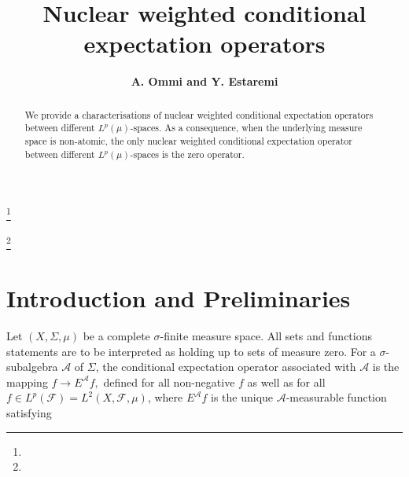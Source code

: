 \documentclass{amsart}
\theoremstyle{definition}\newtheorem{defn}[thm]{Definition}
\theoremstyle{remark}
\numberwithin{equation}{section}
\begin{document}
\title[Nuclear WCE operators]{Nuclear weighted conditional expectation operators }

\author{\sc\bf A. Ommi and Y. Estaremi}
\address{\sc }
\address{}
\email{}
\address{\sc Y. Estaremi}
\address{Department of Mathematics, Faculty of Sciences, Golestan University, Gorgan, Iran.}
\address{\sc}
\email{}
\address{}

\thanks{}

\thanks{}

\subjclass[]{}

\keywords{}

\date{}

\dedicatory{}

\commby{}

\begin{abstract}
We provide a characterisations of nuclear weighted conditional expectation operators between different $L^p(\mu)$-spaces. As a consequence, when the underlying measure space is non-atomic, the only nuclear weighted conditional expectation operator between different $L^p(\mu)$-spaces is the zero operator.
\end{abstract}

\maketitle

\section{ \sc\bf Introduction and Preliminaries}
Let $(X, \Sigma, \mu)$ be a complete $\sigma$-finite measure space. All sets and functions statements  are to be interpreted as holding up to sets of measure zero.
For a $\sigma$-subalgebra $\mathcal{A}$ of $\Sigma$, the conditional expectation operator associated with $\mathcal{A}$ is the mapping $f\rightarrow E^{\mathcal{A}}f,$ defined for all non-negative $f$ as well as for all $f\in L^p(\mathcal{F})=L^2(X, \mathcal{F}, \mu)$, where $E^{\mathcal{A}}f$ is the unique $\mathcal{A}$-measurable function satisfying
\end{document}
